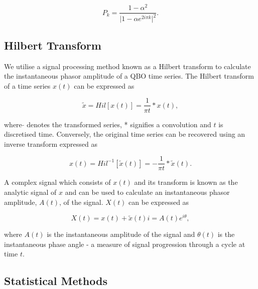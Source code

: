 \begin{equation} \label{theoretical_fourier}
P_k = \frac{1 - \alpha^2}{\vert 1 - \alpha e^{2i\pi k} \vert^2}.
\end{equation}

\subsection{Hilbert Transform}
We utilise a signal processing method known as a Hilbert transform to calculate the instantaneous phasor amplitude of a QBO time series. The Hilbert transform of a time series $x(t)$ can be expressed as

\begin{equation} \label{theoretical_fourier}
\tilde{x} = Hil[x(t)] = \frac{1}{\pi t} * x(t),
\end{equation}

where $\tilde{}$ denotes the transformed series, * signifies a convolution and $t$ is discretised time. Conversely, the original time series can be recovered using an inverse transform expressed as

\begin{equation} \label{theoretical_fourier}
{x(t)} = Hil^{-1}[\tilde{x}(t)] = -\frac{1}{\pi t} * \tilde{x}(t).
\end{equation}

A complex signal which consists of $x(t)$ and its transform is known as the analytic signal of $x$ and can be used to calculate an instantaneous phasor amplitude, $A(t)$, of the signal. $X(t)$ can be expressed as

\begin{equation} \label{theoretical_fourier}
X(t) = x(t) + \tilde{x}(t) i = A(t) e^{i\theta},
\end{equation}

where $A(t)$ is the instantaneous amplitude of the signal and $\theta(t)$ is the instantaneous phase angle - a measure of signal progression through a cycle at time $t$.

\subsection{Statistical Methods}
\label{sec:stat_tests}

